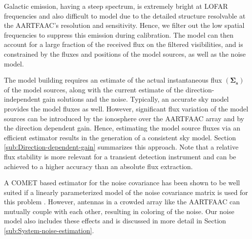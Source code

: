 \documentclass{aa}
\begin{document}
Galactic  emission,  having a  steep  spectrum,  is  extremely bright  at  LOFAR
frequencies and also difficult to model due to the detailed structure resolvable
at  the AARTFAAC's  resolution and  sensitivity. Hence,  we filter  out  the low
spatial frequencies to suppress this  emission during calibration. The model can
then  account  for  a large  fraction  of  the  received  flux on  the  filtered
visibilities,  and is  constrained  by the  fluxes  and positions  of the  model
sources, as well as the noise model. 

The  model  building requires  an  estimate  of  the actual  instantaneous  flux
$\left(\mathbf{\Sigma_{s}}\right)$ of the model  sources, along with the current
estimate of the  direction-independent gain solutions and  the noise. Typically,
an accurate sky  model provides the model fluxes  as well.  However, significant
flux variation of the model sources can be introduced by the ionosphere over the
AARTFAAC array and by  the direction dependent  gain.  Hence, estimating
the model source fluxes via an  efficient estimator results in the generation of
a consistent  sky model.  Section  \ref{sub:Direction-dependent-gain} summarizes
this  approach.  Note  that a  relative flux  stability is  more relevant  for a
transient detection instrument and can be achieved to a higher accuracy than an
absolute flux extraction.  

A  COMET based estimator  for the  noise covariance  has been  shown to  be well
suited if a linearly parameterized model  of the noise covariance matrix is used
for this problem \citep{ottersten1998covariance}.  However, antennas in a crowded
array  like the  AARTFAAC  can mutually  couple  with each  other, resulting  in
coloring  of the  noise. Our  noise  model also  includes these effects and  is
discussed in more detail in Section \ref{sub:System-noise-estimation}.

\end{document}
